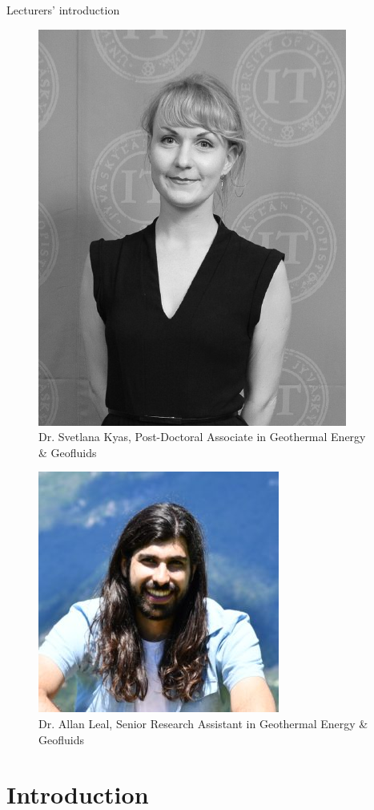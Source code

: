 \begin{frame}{Lecturers' introduction}
\lcol
\begin{singlespace}
%
\begin{figure}
\centering
\includegraphics[height=0.6\columnwidth]{figures/intro/logo-kyas}
\caption*{Dr. Svetlana Kyas, Post-Doctoral Associate in Geothermal Energy \& Geofluids}
\end{figure}
%
\end{singlespace}
%
\rcol
\begin{figure}
\vskip 5pt
\centering
\includegraphics[height=0.6\columnwidth]{figures/intro/logo-leal.jpg}
\caption*{Dr. Allan Leal, Senior Research Assistant in Geothermal Energy \& Geofluids}
\end{figure}
\ecol
  
\end{frame}

\section[Introduction]{Introduction}

